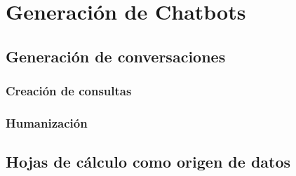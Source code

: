 \chapter{Generación de Chatbots}

\section{Generación de conversaciones}

\subsection{Creación de consultas}

\subsection{Humanización}





\section{Hojas de cálculo como origen de datos}